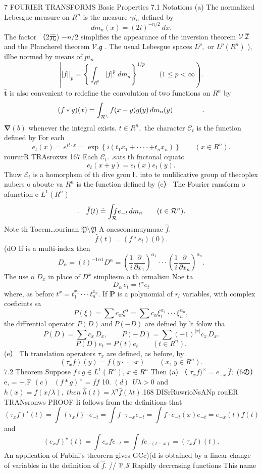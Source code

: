 7 FOURIER TRANSFORMS Basic Properties 7.1 Notations (a) Thc normalized Lcbesgue measure on $R^{n}$ is the measure $\gamma i_{n}$ defined by $$ d m_{n}(x)=(2i)^{-n/2}\ d x. $$ The factor （2元) $-n/2$ simplifies the appearance of the inversion theorem ${\mathcal{V}}.{\overline{{\cal{I}}}}$ and the Plancherel theorem ${\mathcal{V}}.{\mathfrak{g}}$ . The usual Lebesgue spaces $L^{p},$ or $L^{p}(R^{n})$ ), illbe normed by means of $p i_{n}$ $$ \left||f||_{p}=\left\{\int_{R^{n}}|f|^{p}\;d m_{n}\right\}^{1/p}\qquad (1\leq p<\infty\right). $$ $\mathbf{\hat{t}}$ is also convenient to redefine the convolution of two functions on $\textstyle R^{n}$ by $$ (f*g)(x)=\int_{\cal R^{n}}f(x-y)g(y)\,d m_{n}(y)\,\qquad\qquad. $$ $\mathbf{\nabla}(b)$ whenever the integral exists. $\scriptstyle t\in R^{n},$ the character ${\mathcal{C}}_{t}$ is the function defined by For each $$ e_{t}(x)=e^{i t\cdot x}=\exp\left\{i(t_{1}x_{1}+\cdot\cdot\cdot\cdot+t_{n}x_{n})\right\}\qquad(x\in R^{n}). $$roururR TRAsroxws 167 Each ${\mathcal{C}}_{t}.$ .sats th fnctonal cquato $$ e_{t}(x+y)=e_{t}(x)e_{t}(y). $$ Thuw ${\mathcal{E}}_{t}$ is a homorphsm of th dive grou ${\boldsymbol{\mathsf{I}}}\,.$ into te mulilicative group of thecoplex nubers o aboute va $R^{n}$ is the function defined by (e） The Fourier ransform o afunction e $L^{1}(R^{n})$ $$ .\quad\hat{f}(t)\doteq\int_{\cal R}\!\!\!\!f e_{-t}\,d m_{n}\qquad(t\in{\cal R}^{n}). $$ Note th Toecm…ourinan ${\mathfrak{Y}}\setminus\mathfrak{Y}$ A oneseonsmuymuae ${\hat{f}}.$ $$ {\hat{f}}(t)=(f*e_{t})(0). $$ (dO If is a multi-index then $$ D_{\alpha}=(i)^{-1\alpha1}D^{\alpha}=\left(\frac{1}{i}\frac{\partial}{\partial x_{1}}\right)^{\alpha_{1}}\cdot\cdot\cdot\left(\frac{1}{i}\frac{\partial}{\partial x_{n}}\right)^{\alpha_{n}}. $$ The use o $\textstyle{D_{x}}$ in place of $D^{x}$ simpliesm o th ormalism Noe ta $$ D_{\alpha}\,e_{t}=t^{x}e_{t} $$ where, as beforc $t^{x}=t_{1}^{x_{1}}\cdot\cdot\cdot t_{n}^{x_{n}}.$ If ${\boldsymbol{P}}$ is a polynomial of $r_{\mathit{l}}$ variables, with complex coeficints sa $$ P(\xi)=\sum c_{\alpha}\xi^{\alpha}=\sum c_{\alpha}\xi_{1}^{\alpha_{1}}\cdot\cdot\cdot\xi_{n}^{\alpha_{n}}, $$ the diffrential operator $P(D){\mathrm{~and~}}P(-D)$ are defned by lt folow tha $$ P(D)=\sum c_{x}\,D_{x},\qquad P(-\,D)=\sum(-1)^{\left|x\right|}c_{x}\,D_{x}. $$ $$ P(D)e_{t}=P(t)e_{t}\qquad(t\in R^{n}). $$ (e） Th translation operators $\tau_{x}$ are defined, as before, by $$ (\tau_{x}f)(y)=f(y{\cdot}\!\,\!\cdot\!\lnot x)\qquad(x,\,y\in R^{n}). $$ 7.2 Theorem Suppose $f\circ g\in L^{1}(R^{n}),\,x\in R^{n}$ Then (a) （ $\tau_{x}f)^{\times}=e_{-x}\,\hat{f};$ (6の）e, = +,F $(c)\ \ \ (f*g)^{\times}=f\dot{f}$ 10. $(d)\ \ U\lambda>0$ and $h(x)=f(x/\lambda),\;t h e n\;\hat{h}(t)=\lambda^{n}\hat{f}(\lambda t).$168 DISrRuwrioNsANp rouER TRANsronws PROOF Ii follows from the definitions that $$ (\tau_{x}f)^{\star}(t)=\int(\tau_{x}f)\cdot e_{-t}=\int f\cdot\tau_{-x}e_{-t}=\int f\cdot e_{-t}(x)e_{-t}=e_{-x}(t){\hat{f}}(t) $$ and $$ (e_{x}f)^{\star}(t)=\int e_{x}f e_{-t}=\int\!f e_{-(t-x)}=(\tau_{x}f)(t). $$ An application of Fubini's theorern gives GCc)(d is obtained by a linear change of variables in the definition of ${\hat{f}}.$ // ${\mathcal{V}}_{\cdot}{\mathcal{S}}$ Rapidly dccrcasing functions This name 